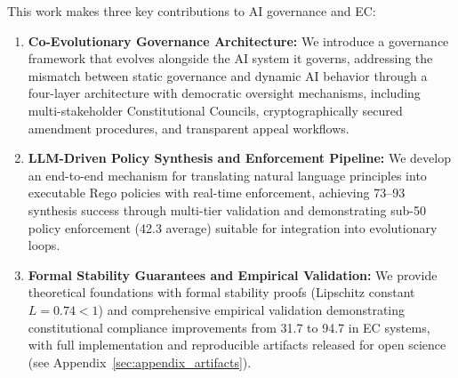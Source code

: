 This work makes three key contributions to AI governance and EC\@:
\begin{enumerate}[leftmargin=*,topsep=2pt,itemsep=2pt,parsep=0pt]
    \item \textbf{Co-Evolutionary Governance Architecture:} We introduce a governance framework that evolves alongside the AI system it governs, addressing the mismatch between static governance and dynamic AI behavior through a four-layer architecture with democratic oversight mechanisms, including multi-stakeholder Constitutional Councils, cryptographically secured amendment procedures, and transparent appeal workflows.
    \item \textbf{LLM-Driven Policy Synthesis and Enforcement Pipeline:} We develop an end-to-end mechanism for translating natural language principles into executable Rego policies with real-time enforcement, achieving 73--93\percent{} synthesis success through multi-tier validation and demonstrating sub-50\ms{} policy enforcement (42.3\ms{} average) suitable for integration into evolutionary loops.
    \item \textbf{Formal Stability Guarantees and Empirical Validation:} We provide theoretical foundations with formal stability proofs (Lipschitz constant $L = 0.74 < 1$) and comprehensive empirical validation demonstrating constitutional compliance improvements from 31.7\percent{} to 94.7\percent{} in EC systems, with full implementation and reproducible artifacts released for open science (see Appendix~\ref{sec:appendix_artifacts}).
\end{enumerate}
